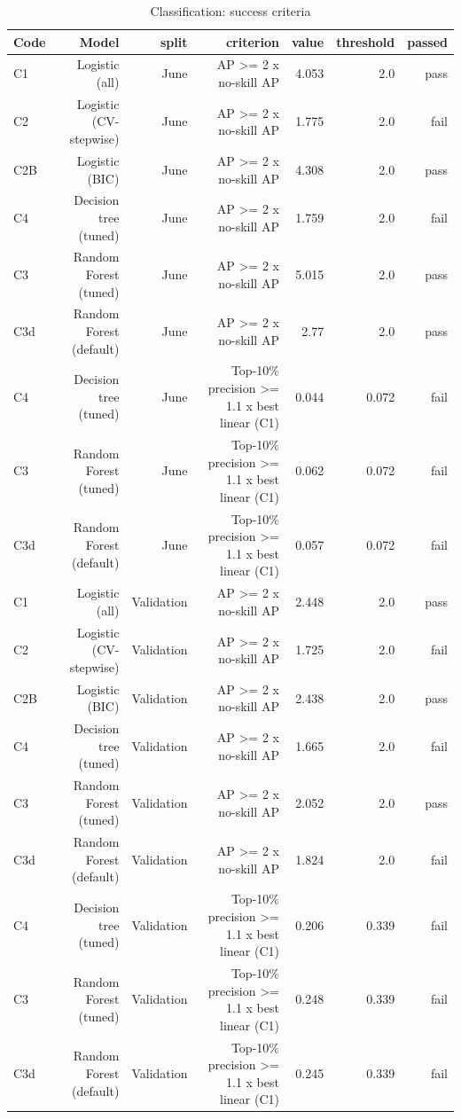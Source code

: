 \begin{table}[htbp]
\centering
\small
\caption{Classification: success criteria}
\begin{tabular}{lrrrrrr}
\toprule
Code & Model & split & criterion & value & threshold & passed \\
\midrule
C1 & Logistic (all) & June & AP >= 2 x no-skill AP & 4.053 & 2.0 & pass \\
C2 & Logistic (CV-stepwise) & June & AP >= 2 x no-skill AP & 1.775 & 2.0 & fail \\
C2B & Logistic (BIC) & June & AP >= 2 x no-skill AP & 4.308 & 2.0 & pass \\
C4 & Decision tree (tuned) & June & AP >= 2 x no-skill AP & 1.759 & 2.0 & fail \\
C3 & Random Forest (tuned) & June & AP >= 2 x no-skill AP & 5.015 & 2.0 & pass \\
C3d & Random Forest (default) & June & AP >= 2 x no-skill AP & 2.77 & 2.0 & pass \\
C4 & Decision tree (tuned) & June & Top-10\% precision >= 1.1 x best linear (C1) & 0.044 & 0.072 & fail \\
C3 & Random Forest (tuned) & June & Top-10\% precision >= 1.1 x best linear (C1) & 0.062 & 0.072 & fail \\
C3d & Random Forest (default) & June & Top-10\% precision >= 1.1 x best linear (C1) & 0.057 & 0.072 & fail \\
C1 & Logistic (all) & Validation & AP >= 2 x no-skill AP & 2.448 & 2.0 & pass \\
C2 & Logistic (CV-stepwise) & Validation & AP >= 2 x no-skill AP & 1.725 & 2.0 & fail \\
C2B & Logistic (BIC) & Validation & AP >= 2 x no-skill AP & 2.438 & 2.0 & pass \\
C4 & Decision tree (tuned) & Validation & AP >= 2 x no-skill AP & 1.665 & 2.0 & fail \\
C3 & Random Forest (tuned) & Validation & AP >= 2 x no-skill AP & 2.052 & 2.0 & pass \\
C3d & Random Forest (default) & Validation & AP >= 2 x no-skill AP & 1.824 & 2.0 & fail \\
C4 & Decision tree (tuned) & Validation & Top-10\% precision >= 1.1 x best linear (C1) & 0.206 & 0.339 & fail \\
C3 & Random Forest (tuned) & Validation & Top-10\% precision >= 1.1 x best linear (C1) & 0.248 & 0.339 & fail \\
C3d & Random Forest (default) & Validation & Top-10\% precision >= 1.1 x best linear (C1) & 0.245 & 0.339 & fail \\
\bottomrule
\end{tabular}
\par\smallskip\begin{minipage}{\linewidth}\footnotesize \end{minipage}
\end{table}

